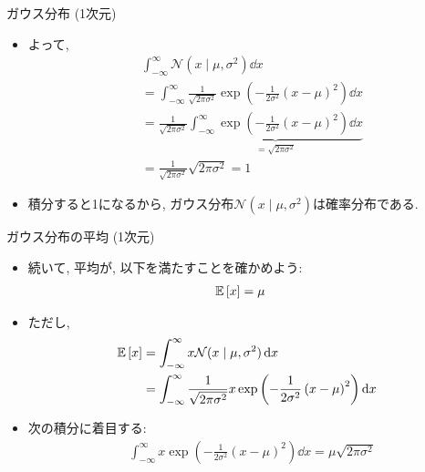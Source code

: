 \documentclass[dvipdfmx,notheorems,t]{beamer}
\begin{document}
\begin{frame}{ガウス分布 (1次元)}
\begin{itemize}
  \item よって,
  \begin{align*}
    & \int_{-\infty}^\infty \mathcal{N}(x \mid \mu, \sigma^2) \dd{x} \\
    &= \int_{-\infty}^\infty \frac{1}{\sqrt{2 \pi \sigma^2}}
      \exp \left( -\frac{1}{2 \sigma^2} \left( x - \mu \right)^2 \right) \dd{x} \\
    &= \frac{1}{\sqrt{2 \pi \sigma^2}} \underbrace{\int_{-\infty}^\infty
      \exp \left( -\frac{1}{2 \sigma^2} \left( x - \mu \right)^2 \right) \dd{x}}_{= \sqrt{2 \pi \sigma^2}} \\
    &= \frac{1}{\sqrt{2 \pi \sigma^2}} \sqrt{2 \pi \sigma^2} = 1
  \end{align*}
  \item 積分すると1になるから, ガウス分布$\mathcal{N}(x \mid \mu, \sigma^2)$は確率分布である.
\end{itemize}
\end{frame}

\begin{frame}{ガウス分布の平均 (1次元)}
\begin{itemize}
  \item 続いて, 平均が, 以下を満たすことを確かめよう:
  \begin{align*}
    \operatorname{\mathbb{E}} \left[ x \right] &= \mu
  \end{align*}
  \item ただし,
  \begin{align*}
    \operatorname{\mathbb{E}} \left[ x \right] &= \int_{-\infty}^\infty x \mathcal{N}(x \mid \mu, \sigma^2) \dd{x} \\
      &= \int_{-\infty}^\infty \frac{1}{\sqrt{2 \pi \sigma^2}} x
        \exp \left( -\frac{1}{2 \sigma^2} \left( x - \mu \right)^2 \right) \dd{x}
  \end{align*}
  \item 次の積分に着目する:
  \begin{align*}
    & \int_{-\infty}^\infty x \exp
      \left( -\frac{1}{2 \sigma^2} \left( x - \mu \right)^2 \right) \dd{x}
      = \mu \sqrt{2 \pi \sigma^2}
  \end{align*}
\end{itemize}
\end{frame}
\end{document}
